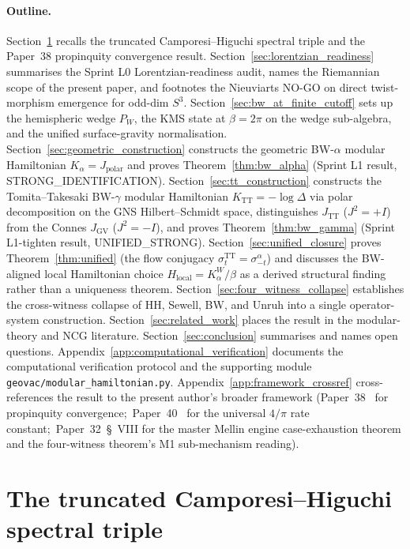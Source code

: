 \documentclass[11pt,a4paper]{article}
\theoremstyle{plain}
\theoremstyle{definition}
\newcommand{\sthree}{S^{3}}
\newcommand{\TT}{\mathrm{TT}}
\begin{document}
\paragraph{Outline.}
Section~\ref{sec:setup} recalls the truncated Camporesi--Higuchi
spectral triple and the Paper~38 propinquity convergence result.
Section~\ref{sec:lorentzian_readiness} summarises the Sprint L0
Lorentzian-readiness audit, names the Riemannian scope of the present
paper, and footnotes the Nieuviarts NO-GO on direct twist-morphism
emergence for odd-dim $\sthree$. Section~\ref{sec:bw_at_finite_cutoff}
sets up the hemispheric wedge $P_W$, the KMS state at $\beta = 2\pi$
on the wedge sub-algebra, and the unified surface-gravity normalisation.
Section~\ref{sec:geometric_construction} constructs the geometric
BW-$\alpha$ modular Hamiltonian $K_\alpha = J_{\mathrm{polar}}$ and
proves Theorem~\ref{thm:bw_alpha} (Sprint L1 result, STRONG\_IDENTIFICATION).
Section~\ref{sec:tt_construction} constructs the Tomita--Takesaki
BW-$\gamma$ modular Hamiltonian $K_{\TT} = -\log \Delta$ via polar
decomposition on the GNS Hilbert--Schmidt space, distinguishes
$J_{\TT}$ ($J^2 = +I$) from the Connes $J_{\mathrm{GV}}$ ($J^2 = -I$),
and proves Theorem~\ref{thm:bw_gamma} (Sprint L1-tighten result,
UNIFIED\_STRONG). Section~\ref{sec:unified_closure} proves
Theorem~\ref{thm:unified} (the flow conjugacy $\sigma_t^{\TT} =
\sigma_{-t}^{\alpha}$) and discusses the BW-aligned local Hamiltonian
choice $H_{\mathrm{local}} = K_\alpha^W / \beta$ as a derived
structural finding rather than a uniqueness theorem.
Section~\ref{sec:four_witness_collapse} establishes the cross-witness
collapse of HH, Sewell, BW, and Unruh into a single operator-system
construction. Section~\ref{sec:related_work} places the result in the
modular-theory and NCG literature. Section~\ref{sec:conclusion}
summarises and names open questions.
Appendix~\ref{app:computational_verification} documents the
computational verification protocol and the supporting module
\texttt{geovac/modular\_hamiltonian.py}.
Appendix~\ref{app:framework_crossref} cross-references the result to
the present author's broader framework
(Paper~38~\cite{paper38} for propinquity convergence;\
Paper~40~\cite{paper40_unified} for the universal $4/\pi$ rate
constant;\ Paper~32~\S~VIII for the master Mellin engine
case-exhaustion theorem and the four-witness theorem's M1
sub-mechanism reading).

\section{The truncated Camporesi--Higuchi spectral triple}\label{sec:setup}
\end{document}

